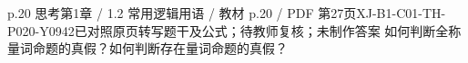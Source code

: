 \par\noindent\begin{minipage}{\linewidth}
\begin{bankitem}{p.20 思考}{第1章 / 1.2 常用逻辑用语 / 教材 p.20 / PDF 第27页}{XJ-B1-C01-TH-P020-Y0942}{已对照原页转写题干及公式；待教师复核；未制作答案}
如何判断全称量词命题的真假？如何判断存在量词命题的真假？
\end{bankitem}
\end{minipage}\par\medskip
